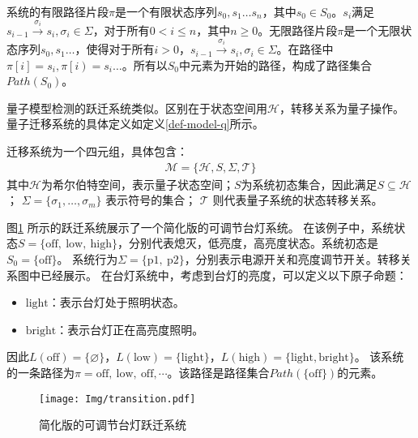 系统的有限路径片段\(\pi\)是一个有限状态序列\(s_0,s_1\ldots s_n\)，其中\(s_0\in S_0\)。\(s_i\)满足\(s_{i-1}\overset{\sigma_i}{\rightarrow}s_i,\sigma_i\in \Sigma\)，对于所有\(0<i\leq n\)，其中\(n\geq 0 \)。无限路径片段\(\pi\)是一个无限状态序列\(s_0,s_1\ldots\)，使得对于所有\(i>0\)，\(s_{i-1} \overset{\sigma_i}{\rightarrow}  s_i,\sigma_i\in \Sigma\)。在路径中\(\pi\left[i\right]=s_i,\pi\left[i\right)=s_i\ldots\)。所有以\(S_0\)中元素为开始的路径，构成了路径集合\(Path\left(S_0\right)\)。

量子模型检测的跃迁系统类似。区别在于状态空间用\(\mathcal{H}\)，转移关系为量子操作。量子迁移系统的具体定义如定义\ref{def-model-q}所示。
\begin{definition}\citep{2021}
    \label{def-model-q}
    迁移系统为一个四元组，具体包含：
    \begin{align}
        \mathcal{M}=\{\mathcal{H},S,\Sigma,\mathcal{T}\}
    \end{align}
    其中\(\mathcal{H}\)为希尔伯特空间，表示量子状态空间；\(S\)为系统初态集合，因此满足\(S\subseteq \mathcal{H}\)； $\Sigma=\{\sigma_1,\ldots,\sigma_m\}$ 表示符号的集合； $\mathcal{T}$ 则代表量子系统的状态转移关系。
\end{definition}
\begin{example}
    \label{ex-transition}
    图\ref{fig:transition-system} 所示的跃迁系统展示了一个简化版的可调节台灯系统。
    在该例子中，系统状态\(S=\{\text{off},\ \text{low},\ \text{high}\}\)，分别代表熄灭，低亮度，高亮度状态。系统初态是\(S_0 = \{\text{off}\}\)。
    系统行为\(\Sigma=\{\text{p1},\ \text{p2}\}\)，分别表示电源开关和亮度调节开关。转移关系图中已经展示。
    在台灯系统中，考虑到台灯的亮度，可以定义以下原子命题：
\begin{itemize}
    \item \(\text{light}\)：表示台灯处于照明状态。
    \item \(\text{bright}\)：表示台灯正在高亮度照明。
\end{itemize}
因此\(L\left(\text{off}  \right)=\{\varnothing\}\)，\(L\left(\text{low}\right)=\{\text{light}\}\)，\(L\left(\text{high}  \right)=\{\text{light},\text{bright}\}\)。
该系统的一条路径为\(\pi = \text{off},\ \text{low}, \ \text{off}, \cdots  \)。该路径是路径集合\(Path(\{\text{off}\})\)的元素。
    \begin{figure}[!htbp]
        \centering
        \texttt{[image: Img/transition.pdf]}
        \caption{简化版的可调节台灯跃迁系统}
        \label{fig:transition-system}
    \end{figure}
\end{example}

